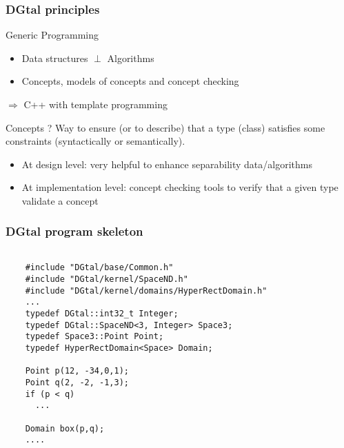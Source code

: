 \documentclass[8pt]{beamer}
\begin{document}





\begin{frame}
  \frametitle{DGtal principles}
\small
  \begin{block}{Generic Programming}
    \begin{itemize}
    \item Data structures $\perp$ Algorithms  
    \item Concepts, models of concepts and concept checking
    \end{itemize}
  \end{block}

\vspace{0.6cm}
\alert{$\Rightarrow$ C++  with template programming }
\small

\begin{exampleblock}{Concepts ?}
  Way to ensure (or to describe) that a type (class) satisfies some
  constraints (syntactically or semantically).
  \begin{itemize}
  \item At design level: very helpful to enhance separability
    data/algorithms
  \item At implementation level: concept checking tools to verify that
    a given type validate a concept
  \end{itemize}
\end{exampleblock}
\end{frame}

\begin{frame}[containsverbatim]
\frametitle{DGtal program skeleton}

  \begin{lstlisting}
    
    #include "DGtal/base/Common.h"
    #include "DGtal/kernel/SpaceND.h"
    #include "DGtal/kernel/domains/HyperRectDomain.h"
    ...
    typedef DGtal::int32_t Integer;
    typedef DGtal::SpaceND<3, Integer> Space3;
    typedef Space3::Point Point;
    typedef HyperRectDomain<Space> Domain;
    
    Point p(12, -34,0,1);
    Point q(2, -2, -1,3);
    if (p < q)
      ...
    
    Domain box(p,q);
    ....

  \end{lstlisting}
\end{frame}
\end{document}
